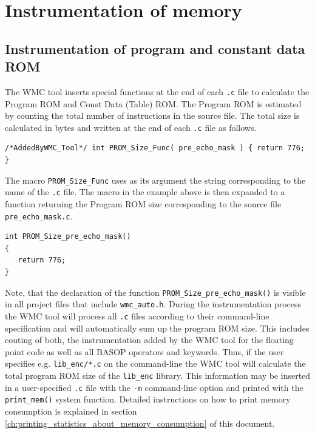 \section{Instrumentation of memory}
\label{ch:instrumentation_of_memory}

\subsection{Instrumentation of program and constant data ROM}

The WMC tool inserts special functions at the end of each \verb|.c| file to calculate the Program ROM and Const Data (Table) ROM. The Program ROM is estimated by counting the total number of instructions in the source file. The total size is calculated in bytes and written at the end of each \verb|.c| file as follows.

\begin{Verbatim}[fontsize=\small]
/*AddedByWMC_Tool*/ int PROM_Size_Func( pre_echo_mask ) { return 776; }
\end{Verbatim}

The macro \verb|PROM_Size_Func| uses as its argument the string corresponding to the name of the \verb|.c| file. The macro in the example above is then expanded to a function returning the Program ROM size corresponding to the source file \verb|pre_echo_mask.c|.

\begin{Verbatim}[fontsize=\small]
int PROM_Size_pre_echo_mask()
{
   return 776;
}
\end{Verbatim}

Note, that the declaration of the function \verb|PROM_Size_pre_echo_mask()| is visible in all project files that include \verb|wmc_auto.h|. During the instrumentation process the WMC tool will process all \verb|.c| files according to their command-line specification and will automatically sum up the program ROM size. This includes couting of both, the instrumentation added by the WMC tool for the floating point code as well as all BASOP operators and keywords. Thus, if the user specifies e.g. \verb|lib_enc/*.c| on the command-line the WMC tool will calculate the total program ROM size of the \verb|lib_enc| library. This information may be inserted in a user-specified \verb|.c| file with the \verb|-m| command-line option and printed with the \verb|print_mem()| system function. Detailed instructions on how to print memory consumption is explained in section \ref{ch:printing_statistics_about_memory_consumption} of this document.

